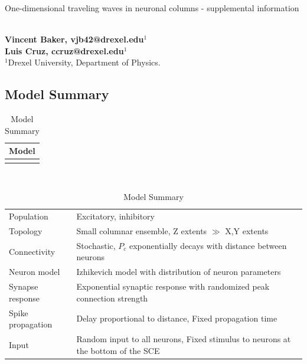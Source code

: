 \documentclass[12pt]{article}
\begin{document}
\vspace{20mm}

{\LARGE One-dimensional traveling waves in neuronal columns - supplemental information}

\ \\
{\bf \large Vincent Baker, vjb42@drexel.edu$^{\displaystyle 1}$}\\
{\bf \large Luis Cruz, ccruz@drexel.edu$^{\displaystyle 1}$}\\
{$^{\displaystyle 1}$Drexel University, Department of Physics.}\\

\pagebreak

\subsection*{Model Summary}
\begin{table}[!htb]
 \caption{Model Summary}
 \label{tab:all_params}
 \centering
 \begin{tabular}{c}
  \textbf{Model} \\
  \hline \\
 \end{tabular} \\
 \begin{tabular}{l|l}
  Population & Excitatory, inhibitory \\
  Topology & Small columnar ensemble, Z extents $\gg$ X,Y extents \\
  Connectivity & Stochastic, $P_c$ exponentially decays with distance between neurons \\
  Neuron model & Izhikevich model with distribution of neuron parameters \\
  Synapse response & Exponential synaptic response with randomized peak connection strength  \\
  Spike propagation & Delay proportional to distance, Fixed propagation time \\
  Input & Random input to all neurons, Fixed stimulus to neurons at the bottom of the SCE \\
 \end{tabular}
\end{table}
\end{document}
